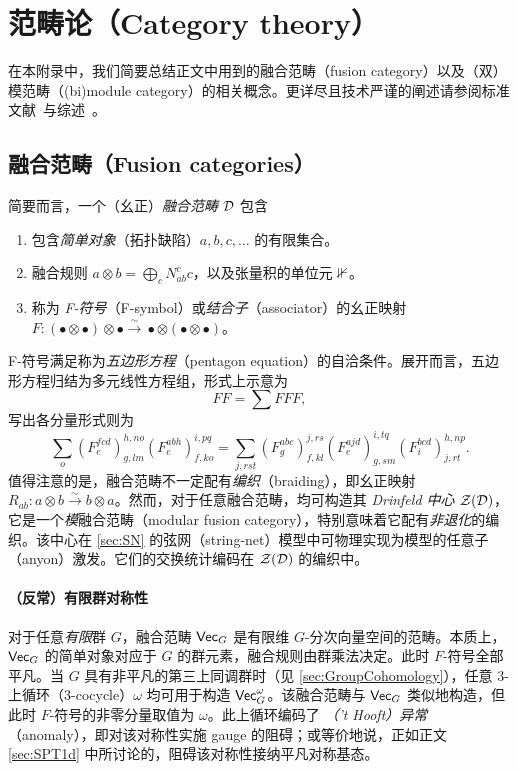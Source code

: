 \section{范畴论（Category theory）}\label{sec:cat}
在本附录中，我们简要总结正文中用到的融合范畴（fusion category）以及（双）模范畴（(bi)module category）的相关概念。更详尽且技术严谨的阐述请参阅标准文献~\cite{Etingof2002,Etingof2015,Ostrik2001}与综述~\cite{Kitaev2005a,Beer2018,Kong2022}。

\subsection{融合范畴（Fusion categories）}
简要而言，一个（幺正）\emph{融合范畴} $\mathcal D$ 包含
\begin{enumerate}
    \item 包含\emph{简单对象}（拓扑缺陷）$a,b,c,\dots$ 的有限集合。
    \item 融合规则 $a\otimes b =\bigoplus_c N_{ab}^c c$，以及张量积的单位元 $\mathbb 1$。
    \item 称为 \emph{F-符号}（F-symbol）或\emph{结合子}（associator）的幺正映射 $F:(\bullet \otimes\bullet)\otimes\bullet\overset{\sim}{\rightarrow}\bullet\otimes(\bullet\otimes\bullet)$。
\end{enumerate}
F-符号满足称为\emph{五边形方程}（pentagon equation）的自洽条件。展开而言，五边形方程归结为多元线性方程组，形式上示意为
\begin{equation}
    FF = \sum FFF,
\end{equation}
写出各分量形式则为
\begin{equation}
    \sum_o \left(F^{fcd}_e\right)^{h,no}_{g,lm} \left(F^{abh}_e\right)^{i,pq}_{f,ko} = \sum_{j,rst} \left(F^{abc}_g\right)^{j,rs}_{f,kl} \left(F^{ajd}_e\right)^{i,tq}_{g,sm} \left(F^{bcd}_i\right)^{h,np}_{j,rt}.
\end{equation}
值得注意的是，融合范畴不一定配有\emph{编织}（braiding），即幺正映射 $R_{ab}:a\otimes b\overset{\sim}{\rightarrow}b\otimes a$。然而，对于任意融合范畴，均可构造其 \emph{Drinfeld 中心} $\mathcal Z(\mathcal D)$，它是一个\emph{模}融合范畴（modular fusion category），特别意味着它配有\emph{非退化}的编织。该中心在 \cref{sec:SN} 的弦网（string-net）模型中可物理实现为模型的任意子（anyon）激发。它们的交换统计编码在 $\mathcal Z(\mathcal D)$ 的编织中。

\paragraph{（反常）有限群对称性} 对于任意\emph{有限}群 $G$，融合范畴 $\mathsf{Vec}_G$ 是有限维 $G$-分次向量空间的范畴。本质上，$\mathsf{Vec}_G$ 的简单对象对应于 $G$ 的群元素，融合规则由群乘法决定。此时 $F$-符号全部平凡。当 $G$ 具有非平凡的第三上同调群时（见 \cref{sec:GroupCohomology}），任意 3-上循环（3-cocycle）$\omega$ 均可用于构造 $\mathsf{Vec}_G^\omega$。该融合范畴与 $\mathsf{Vec}_G$ 类似地构造，但此时 $F$-符号的非零分量取值为 $\omega$。此上循环编码了 \emph{（'t Hooft）异常}（anomaly），即对该对称性实施 gauge 的阻碍；或等价地说，正如正文 \cref{sec:SPT1d} 中所讨论的，阻碍该对称性接纳平凡对称基态。

